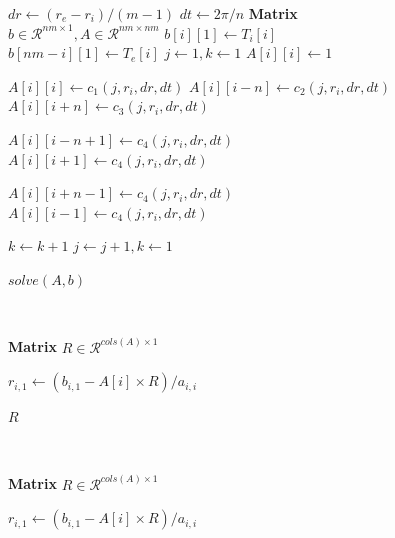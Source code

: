 \begin{figure}[!htb]
\centering
{}
  \begin{algorithmic}[1]
    \State $dr \leftarrow (r_e - r_i) / (m - 1)$
    \State $dt \leftarrow 2\pi/n$
    \State \textbf{Matrix} $b \in \mathcal{R}^{nm\times 1}, A\in \mathcal{R}^{nm\times nm}$
      \State $b[i][1] \leftarrow T_i[i]$
      \State $b[nm-i][1] \leftarrow T_e[i]$
    \EndFor
    \State $j \leftarrow 1, k \leftarrow 1$
	\State $A[i][i] \leftarrow 1$
      \Else
	
	\State $A[i][i] \leftarrow c_1(j, r_i, dr, dt)$
	\State $A[i][i-n] \leftarrow c_2(j, r_i, dr, dt)$
	\State $A[i][i+n] \leftarrow c_3(j, r_i, dr, dt)$
	
	  \State $A[i][i-n+1] \leftarrow c_4(j, r_i, dr, dt)$
	\Else
	  \State $A[i][i+1] \leftarrow c_4(j, r_i, dr, dt)$
	\EndIf
	
	  \State $A[i][i+n-1] \leftarrow c_4(j, r_i, dr, dt)$
	\Else
	  \State $A[i][i-1] \leftarrow c_4(j, r_i, dr, dt)$
	\EndIf

	\State $k \leftarrow k+1$      
	  \State $j \leftarrow j+1, k \leftarrow 1$
	\EndIf
	
      \EndIf
    \EndFor
    \State \Return $solve(A,b)$
  \EndFunction
  \end{algorithmic} 
  
  ~
  
  \begin{algorithmic}[1]
      \State \textbf{Matrix} $R \in \mathcal{R}^{cols(A)\times 1}$
      
	    \State $r_{i,1} \leftarrow (b_{i,1} - A[i] \times R) / a_{i,i}$
	 \EndIf
      \EndFor
      
      \State \Return $R$
    \EndFunction
  \end{algorithmic}   
  
  ~
  
  \begin{algorithmic}[1]
      \State \textbf{Matrix} $R \in \mathcal{R}^{cols(A)\times 1}$
      
	    \State $r_{i,1} \leftarrow (b_{i,1} - A[i] \times R) / a_{i,i}$
	 \EndIf
      \EndFor
      

\end{algorithmic}
\end{figure}
